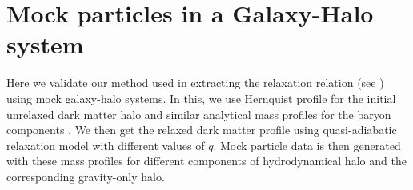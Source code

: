 \section{Mock particles in a Galaxy-Halo system}
\label{appen:Mock-ch:z0main}
Here we validate our method used in extracting the relaxation relation (see ) using mock galaxy-halo systems.
In this, we use Hernquist profile for the initial unrelaxed dark matter halo and similar analytical mass profiles for the baryon components \citep[see appendix of][]{2021MNRAS.507..632P}. We then get the relaxed dark matter profile using quasi-adiabatic relaxation model with different values of $q$. Mock particle data is then generated with these mass profiles for different components of hydrodynamical halo and the corresponding gravity-only halo.

